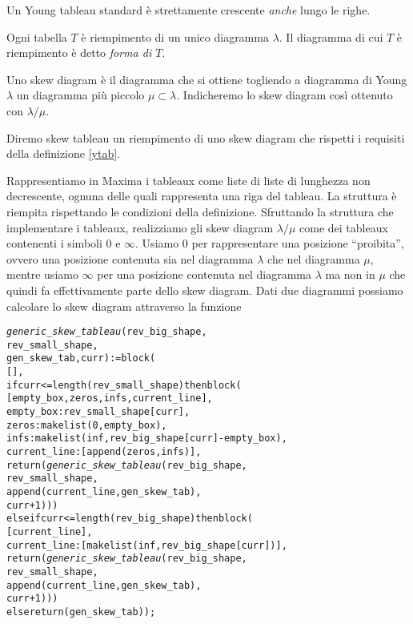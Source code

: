 \begin{oss}
Un Young tableau standard \`e strettamente crescente \emph{anche}
lungo le righe.
\end{oss}

\begin{oss}
Ogni tabella $T$ \`e riempimento di un unico diagramma $\lambda$. Il
diagramma di cui $T$ \`e riempimento \`e detto \emph{forma di $T$}.
\end{oss}

\begin{defn}
Uno skew diagram \`e il diagramma che si ottiene togliendo a
diagramma di Young $\lambda$ un diagramma pi\`u piccolo $\mu \subset
\lambda$. Indicheremo lo skew diagram cos\`i ottenuto con $\lambda / \mu$.
\end{defn} 

\begin{defn}
Diremo skew tableau un riempimento di uno skew diagram che rispetti i
requisiti della definizione \ref{ytab}. 
\end{defn}

Rappresentiamo in Maxima i tableaux come liste di liste di lunghezza
non decrescente, ognuna delle quali rappresenta una riga del tableau.
La struttura \`e riempita rispettando le condizioni della definizione.
Sfruttando la struttura che implementare i tableaux, realizziamo gli
skew diagram $\lambda/\mu$ come dei tableaux contenenti i simboli $0$ e $\infty$.
Usiamo $0$ per rappresentare una posizione ``proibita'', ovvero una
posizione contenuta sia nel diagramma $\lambda$ che nel diagramma
$\mu$, mentre usiamo $\infty$ per una posizione contenuta nel
diagramma $\lambda$ ma non in $\mu$ che quindi fa effettivamente parte
dello skew diagram. Dati due diagrammi possiamo calcolare lo skew
diagram attraverso la funzione

\begin{alltt}
\emph{generic\_skew\_tableau} (rev\_big\_shape,
                      rev\_small\_shape,
                      gen\_skew\_tab, curr) := block (
  [],
  if curr <= length (rev\_small\_shape) then block (
    [empty\_box,zeros,infs,current\_line],
    empty\_box : rev\_small\_shape[curr],
    zeros : makelist (0, empty\_box),
    infs : makelist (inf, rev\_big\_shape[curr] - empty\_box),
    current\_line : [append (zeros, infs)],
    return (\emph{generic\_skew\_tableau} (rev\_big\_shape,
                                  rev\_small\_shape,
                                  append (current\_line, gen\_skew\_tab),
                                  curr + 1)))
  else if curr <= length (rev\_big\_shape) then block (
    [current\_line],
    current\_line : [makelist (inf, rev\_big\_shape[curr])],
    return (\emph{generic\_skew\_tableau} (rev\_big\_shape,
                                  rev\_small\_shape,
                                  append (current\_line, gen\_skew\_tab),
                                  curr + 1)))
  else return (gen\_skew\_tab));
\end{alltt}

